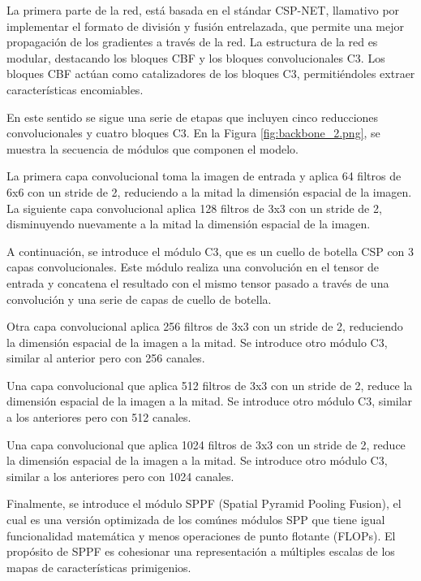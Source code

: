 
La primera parte de la red, está basada en el stándar CSP-NET, llamativo por implementar el formato de división y fusión entrelazada, que permite una mejor propagación de los gradientes a través de la red. La estructura de la red es modular, destacando los bloques CBF y los bloques convolucionales C3. Los bloques CBF actúan como catalizadores de los bloques C3, permitiéndoles extraer características encomiables.

En este sentido se sigue una serie de etapas que incluyen cinco reducciones convolucionales y cuatro bloques C3. En la Figura \ref{fig:backbone_2.png}, se muestra la secuencia de módulos que componen el modelo.

La primera capa convolucional toma la imagen de entrada y aplica 64 filtros de 6x6 con un stride de 2, reduciendo a la mitad la dimensión espacial de la imagen. La siguiente capa convolucional aplica 128 filtros de 3x3 con un stride de 2, disminuyendo nuevamente a la mitad la dimensión espacial de la imagen.

A continuación, se introduce el módulo C3, que es un cuello de botella CSP con 3 capas convolucionales. Este módulo realiza una convolución en el tensor de entrada y concatena el resultado con el mismo tensor pasado a través de una convolución y una serie de capas de cuello de botella.

Otra capa convolucional aplica 256 filtros de 3x3 con un stride de 2, reduciendo la dimensión espacial de la imagen a la mitad. Se introduce otro módulo C3, similar al anterior pero con 256 canales.

Una capa convolucional que aplica 512 filtros de 3x3 con un stride de 2, reduce la dimensión espacial de la imagen a la mitad. Se introduce otro módulo C3, similar a los anteriores pero con 512 canales.

Una capa convolucional que aplica 1024 filtros de 3x3 con un stride de 2, reduce la dimensión espacial de la imagen a la mitad. Se introduce otro módulo C3, similar a los anteriores pero con 1024 canales.

Finalmente, se introduce el módulo SPPF (Spatial Pyramid Pooling Fusion), el cual es una versión optimizada de los comúnes módulos SPP que tiene igual funcionalidad matemática y menos operaciones de punto flotante (FLOPs). El propósito de SPPF es cohesionar una representación a múltiples escalas de los mapas de características primigenios.

